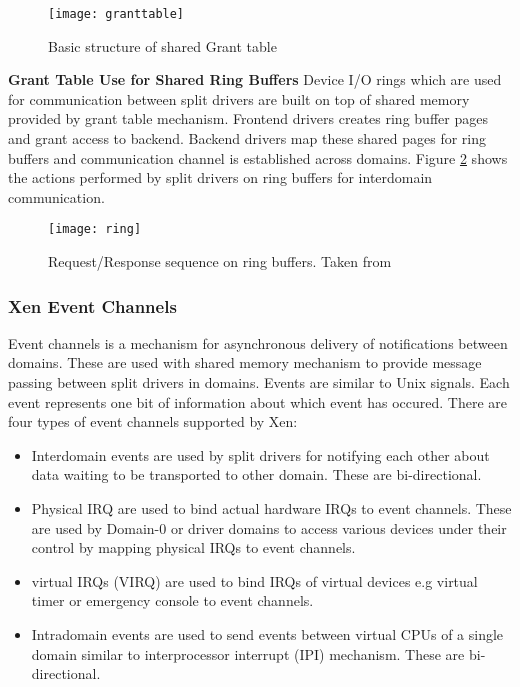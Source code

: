 \begin{figure}[!htbp]
	\centering
	\texttt{[image: granttable]}
	\caption{Basic structure of shared Grant table}
	\label{granttable}
\end{figure}
\textbf{Grant Table Use for Shared Ring Buffers}
Device I/O rings which are used for communication between split drivers are built on top of shared memory provided by grant table mechanism. Frontend drivers creates ring buffer pages and grant access to backend. Backend drivers map these shared pages for ring buffers and communication channel is established across domains. Figure \ref{ring} shows the actions performed by split drivers on ring buffers for interdomain communication.

\begin{figure}[!htbp]
	\centering
	\texttt{[image: ring]}
	\caption{Request/Response sequence on ring buffers. Taken from \cite{xen_book}}
	\label{ring}
\end{figure}
\subsubsection{Xen Event Channels\label{sec:eventchannel}}
Event channels is a mechanism for asynchronous delivery of notifications between domains. These are used with shared memory mechanism to provide message passing between split drivers in domains. Events are similar to Unix signals. Each event represents one bit of information about which event has occured. There are four types of event channels supported by Xen:
\begin{itemize}
	\item Interdomain events are used by split drivers for notifying each other about data waiting to be transported to other domain.  These are bi-directional.
	\item Physical IRQ are used to bind actual hardware IRQs to event channels. These are used by Domain-0 or driver domains to access various devices under their control by mapping physical IRQs to event channels.
	\item virtual IRQs (VIRQ) are used to bind IRQs of virtual devices e.g virtual timer or emergency console to event channels.
	\item Intradomain events are used to send events between virtual CPUs of a single domain similar to interprocessor interrupt (IPI) mechanism. These are bi-directional.
\end{itemize}

